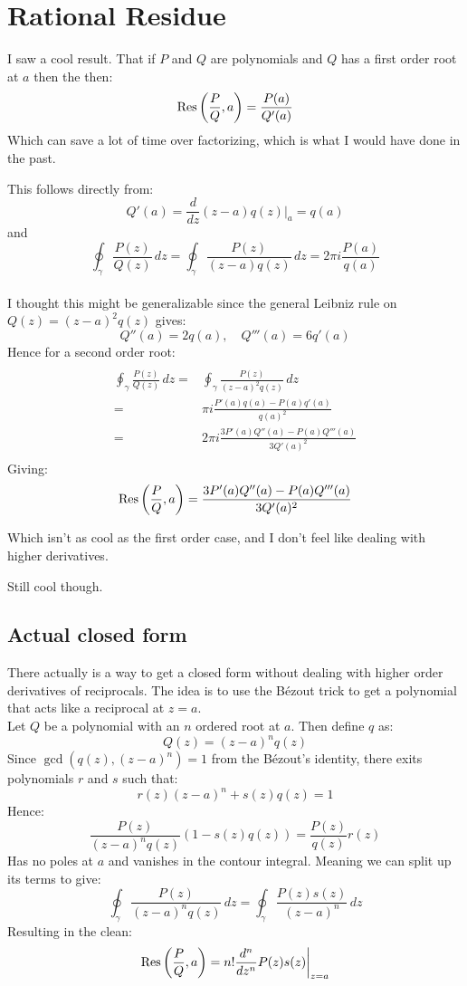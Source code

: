 
\section{Rational Residue}
I saw a cool result.
That if $P$ and $Q$ are polynomials and $Q$ has a first order root at $a$ then the then:
\[\operatorname{Res}\left(\frac{P}{Q},a\right) = \frac{P(a)}{Q'(a)} \]
Which can save a lot of time over factorizing, 
which is what I would have done in the past.

This follows directly from:
\[Q'(a)=\frac{d}{dz}(z-a)q(z)\bigg|_a = q(a)\]
and
\[\oint_\gamma\frac{P(z)}{Q(z)}\,dz = \oint_\gamma \frac{P(z)}{(z-a)q(z)}\,dz = 2\pi i\frac{P(a)}{q(a)}\]
\\

I thought this might be generalizable since the general Leibniz rule on $Q(z)=(z-a)^2q(z)$ gives:
\[Q''(a)=2q(a),\quad Q'''(a)=6q'(a)\]
Hence for a second order root:
\begin{equation*}
\begin{aligned}
\end{aligned}
\end{equation*}
\begin{equation*}
\begin{aligned}
	\oint_\gamma\frac{P(z)}{Q(z)}\,dz =& \oint_\gamma \frac{P(z)}{(z-a)^2q(z)}\,dz \\
	=& \pi i\frac{P'(a)q(a)-P(a)q'(a)}{q(a)^2}\\
	=& 2\pi i\frac{3P'(a)Q''(a)-P(a)Q'''(a)}{3Q'(a)^2}\\
\end{aligned}
\end{equation*}
Giving:
\[\operatorname{Res}\left(\frac{P}{Q},a\right)= \frac{3P'(a)Q''(a)-P(a)Q'''(a)}{3Q'(a)^2} \]

Which isn't as cool as the first order case,
and I don't feel like dealing with higher derivatives.

Still cool though.

\subsection{Actual closed form}
There actually is a way to get a closed form without dealing with higher order derivatives of reciprocals.
The idea is to use the Bézout trick to get a polynomial that acts like a reciprocal at $z=a$.
\\

Let $Q$ be a polynomial with an $n$ ordered root at $a$.
Then define $q$ as:
\[Q(z) = (z-a)^nq(z)\]
Since $\gcd(q(z),(z-a)^n) = 1$ from the Bézout's identity, there exits polynomials $r$ and $s$ such that:
\[r(z)(z-a)^n+s(z)q(z)=1\]
Hence:
\[\frac{P(z)}{(z-a)^nq(z)}(1-s(z)q(z)) = \frac{P(z)}{q(z)}r(z)\]
Has no poles at $a$ and vanishes in the contour integral.
Meaning we can split up its terms to give:
\[\oint_\gamma\frac{P(z)}{(z-a)^nq(z)}\,dz = \oint_\gamma \frac{P(z)s(z)}{(z-a)^n}\,dz\]
Resulting in the clean:
\[\operatorname{Res}\left(\frac{P}{Q},a\right) = n!\frac{d^n}{dz^n}P(z)s(z)\bigg|_{z=a}\]

